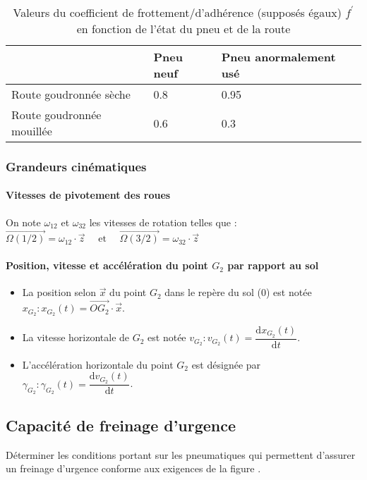 \begin{table}[!h]
\centering
\begin{tabular}{lll}
 & \textbf{Pneu neuf} & \textbf{Pneu anormalement usé} \\
\hline
Route goudronnée sèche & 0.8 & 0.95 \\
Route goudronnée mouillée & 0.6 & 0.3 \\
\hline
\end{tabular}
\caption{Valeurs du coefficient de frottement/d'adhérence (supposés égaux) \(f^{\prime}\) en fonction de l'état du pneu et de la route \label{tab_33}}
\end{table}


\subsubsection{Grandeurs cinématiques}
\paragraph*{Vitesses de pivotement des roues} On note \(\omega_{12}\) et \(\omega_{32}\) les vitesses de rotation telles que :
$
\overrightarrow{\Omega(1 / 2)}=\omega_{12} \cdot \vec{z} \quad \text { et } \quad \overrightarrow{\Omega(3 / 2)}=\omega_{32} \cdot \vec{z}
$

\paragraph*{Position, vitesse et accélération du point \(G_{2}\) par rapport au sol}
\begin{itemize}
\item La position selon \(\vec{x}\) du point \(G_{2}\) dans le repère du sol (0) est notée \(x_{G_{2}}: x_{G_{2}}(t)=\overrightarrow{O G_{2}} \cdot \vec{x}\).
  \item La vitesse horizontale de \(G_{2}\) est notée \(v_{G_{2}}: v_{G_{2}}(t)=\dfrac{\mathrm{d} x_{G_{2}}(t)}{\mathrm{d} t}\).
  \item L'accélération horizontale du point \(G_{2}\) est désignée par \(\gamma_{G_{2}}: \gamma_{G_{2}}(t)=\dfrac{\mathrm{d} v_{G_{2}}(t)}{\mathrm{d} t}\).
\end{itemize}
\fi

\subsection{Capacité de freinage d'urgence}
\ifprof
\else
\begin{obj}
Déterminer les conditions portant sur les pneumatiques qui permettent d'assurer un freinage d'urgence conforme aux exigences de la figure \label{fig_31}.
\end{obj}
\fi

